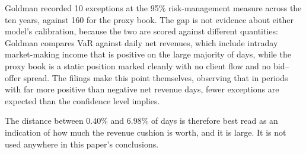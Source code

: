 

Goldman recorded 10 exceptions at the 95\% risk-management measure across the
ten years, against 160 for the proxy book. The gap is not evidence about either
model's calibration, because the two are scored against different quantities:
Goldman compares VaR against daily net revenues, which include intraday
market-making income that is positive on the large majority of days, while the
proxy book is a static position marked cleanly with no client flow and no
bid--offer spread. The filings make this point themselves, observing that in
periods with far more positive than negative net revenue days, fewer exceptions
are expected than the confidence level implies.

The distance between 0.40\% and 6.98\% of days is therefore best read as an
indication of how much the revenue cushion is worth, and it is large. It is not
used anywhere in this paper's conclusions.
